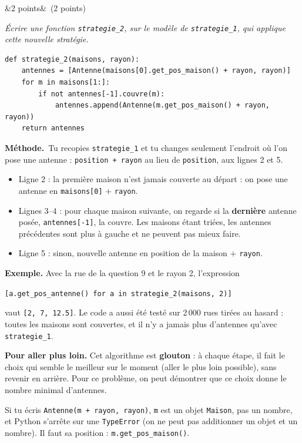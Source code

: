 \documentclass[11pt, a4paper]{exam}
\newcommand{\code}[1]{\texttt{#1}}
\newcommand{\Q}[3]{\par\needspace{5\baselineskip}\bigskip\noindent{\large\bfseries Question #1}\ifx&#2&\else\ \textnormal{(#2)}\fi\par\nopagebreak\smallskip\noindent\textit{#3}\par\nopagebreak\smallskip}
\newcommand{\methode}{\par\noindent\textbf{Méthode.}\ }
\begin{document}
\Q{11}{2 points}{Écrire une fonction \code{strategie\_2}, sur le modèle de \code{strategie\_1}, qui applique cette nouvelle stratégie.}
\begin{reponse}
\begin{lstlisting}
def strategie_2(maisons, rayon):
    antennes = [Antenne(maisons[0].get_pos_maison() + rayon, rayon)]
    for m in maisons[1:]:
        if not antennes[-1].couvre(m):
            antennes.append(Antenne(m.get_pos_maison() + rayon, rayon))
    return antennes
\end{lstlisting}
\end{reponse}
\methode Tu recopies \code{strategie\_1} et tu changes seulement l'endroit où l'on pose une antenne : \code{position + rayon} au lieu de \code{position}, aux lignes 2 et 5.
\begin{itemize}
\item Ligne 2 : la première maison n'est jamais couverte au départ : on pose une antenne en \code{maisons[0]} $+$ \code{rayon}.
\item Lignes 3--4 : pour chaque maison suivante, on regarde si la \textbf{dernière} antenne posée, \code{antennes[-1]}, la couvre. Les maisons étant triées, les antennes précédentes sont plus à gauche et ne peuvent pas mieux faire.
\item Ligne 5 : sinon, nouvelle antenne en position de la maison $+$ \code{rayon}.
\end{itemize}
\textbf{Exemple.} Avec la rue de la question 9 et le rayon 2, l'expression\par\smallskip\hspace*{1.5em}\code{[a.get\_pos\_antenne() for a in strategie\_2(maisons, 2)]}\par\smallskip\noindent vaut \code{[2, 7, 12.5]}. Le code a aussi été testé sur 2\,000 rues tirées au hasard : toutes les maisons sont couvertes, et il n'y a jamais plus d'antennes qu'avec \code{strategie\_1}.

\textbf{Pour aller plus loin.} Cet algorithme est \textbf{glouton} : à chaque étape, il fait le choix qui semble le meilleur sur le moment (aller le plus loin possible), sans revenir en arrière. Pour ce problème, on peut démontrer que ce choix donne le nombre minimal d'antennes.
\begin{erreur}
Si tu écris \code{Antenne(m + rayon, rayon)}, \code{m} est un objet \code{Maison}, pas un nombre, et Python s'arrête sur une \code{TypeError} (on ne peut pas additionner un objet et un nombre). Il faut sa position : \code{m.get\_pos\_maison()}.
\end{erreur}
\end{document}
